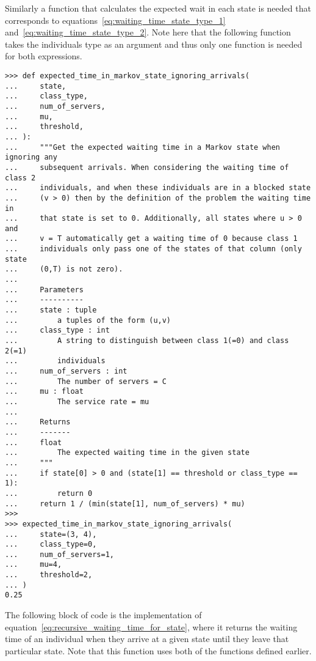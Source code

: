 Similarly a function that calculates the expected wait in each state is needed
that corresponds to equations~\eqref{eq:waiting_time_state_type_1}
and~\eqref{eq:waiting_time_state_type_2}.
Note here that the following function takes the individuals type as an argument
and thus only one function is needed for both expressions.

\begin{lstlisting}[style=pystyle]
>>> def expected_time_in_markov_state_ignoring_arrivals(
...     state,
...     class_type,
...     num_of_servers,
...     mu,
...     threshold,
... ):
...     """Get the expected waiting time in a Markov state when ignoring any
...     subsequent arrivals. When considering the waiting time of class 2
...     individuals, and when these individuals are in a blocked state
...     (v > 0) then by the definition of the problem the waiting time in
...     that state is set to 0. Additionally, all states where u > 0 and
...     v = T automatically get a waiting time of 0 because class 1
...     individuals only pass one of the states of that column (only state
...     (0,T) is not zero).
... 
...     Parameters
...     ----------
...     state : tuple
...         a tuples of the form (u,v)
...     class_type : int
...         A string to distinguish between class 1(=0) and class 2(=1)
...         individuals
...     num_of_servers : int
...         The number of servers = C
...     mu : float
...         The service rate = mu
... 
...     Returns
...     -------
...     float
...         The expected waiting time in the given state
...     """
...     if state[0] > 0 and (state[1] == threshold or class_type == 1):
...         return 0
...     return 1 / (min(state[1], num_of_servers) * mu)
>>>
>>> expected_time_in_markov_state_ignoring_arrivals(
...     state=(3, 4),
...     class_type=0,
...     num_of_servers=1,
...     mu=4,
...     threshold=2,
... )
0.25

\end{lstlisting}

The following block of code is the implementation of
equation~\eqref{eq:recursive_waiting_time_for_state}, where it returns the
waiting time of an individual when they arrive at a given state until they
leave that particular state.
Note that this function uses both of the functions defined earlier.

